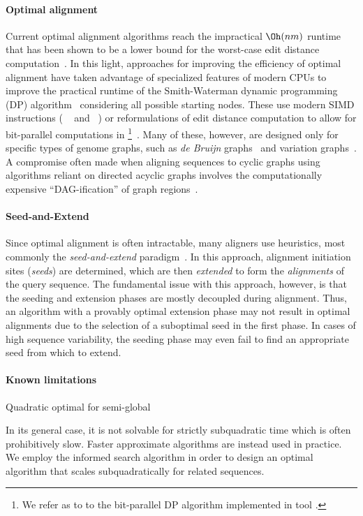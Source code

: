 \paragraph{Optimal alignment}
Current optimal alignment algorithms reach the impractical $\Oh(nm)$ runtime
that has been shown to be a lower bound for the worst-case edit distance
computation~\cite{backurs2015edit}. In this light, approaches for improving the
efficiency of optimal alignment have taken advantage of specialized features of
modern CPUs to improve the practical runtime of the Smith-Waterman dynamic
programming (DP) algorithm~\cite{smith_comparison_1981} considering all possible
starting nodes. These use modern SIMD instructions (\eg
\vg~\cite{garrison_variation_2018} and \pasgal~\cite{jain_accelerating_2019}) or
reformulations of edit distance computation to allow for bit-parallel
computations in \graphaligner \footnote{We refer as \bitparallel to to the
bit-parallel DP algorithm implemented in \graphaligner tool
\cite{rautiainen_bitparallel_2019}.}~\cite{rautiainen_bitparallel_2019}. Many of
these, however, are designed only for specific types of genome graphs, such as
{\itshape de Bruijn}
graphs~\cite{liu_debga_2016,limasset2019toward} and
variation graphs~\cite{garrison_variation_2018}. A compromise often made when
aligning sequences to cyclic graphs using algorithms reliant on directed acyclic
graphs involves the computationally expensive ``DAG-ification'' of graph
regions~\cite{kavya_sequence_2019,garrison_variation_2018}.

\paragraph{Seed-and-Extend}
Since optimal alignment is often intractable, many aligners use heuristics, most
commonly the \emph{seed-and-extend}
paradigm~\cite{altschul_basic_1990,langmead_fast_2012,li_fast_2009}. In this
approach, alignment initiation sites (\emph{seeds}) are determined, which are
then \emph{extended} to form the \emph{alignments} of the query sequence. The
fundamental issue with this approach, however, is that the seeding and extension
phases are mostly decoupled during alignment. Thus, an algorithm with a provably
optimal extension phase may not result in optimal alignments due to the
selection of a suboptimal seed in the first phase. In cases of high sequence
variability, the seeding phase may even fail to find an appropriate seed from
which to extend.

\paragraph{Known limitations}

Quadratic optimal for semi-global

In its general case, it is not solvable for strictly subquadratic time which is
often prohibitively slow. Faster approximate algorithms are instead used in
practice. We employ the \A informed search algorithm in order to design an
optimal algorithm that scales subquadratically for related sequences.
